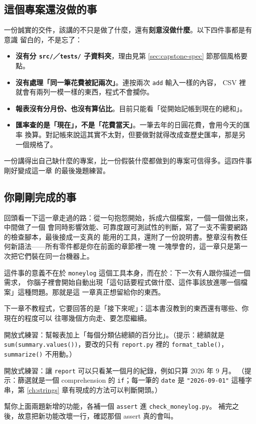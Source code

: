 \subsection*{這個專案還沒做的事}

一份誠實的交件，該講的不只是做了什麼，還有\textbf{刻意沒做什麼}。以下四件事都是有意識
留白的，不是忘了：

\begin{itemize}
\item \textbf{沒有分 \texttt{src/}／\texttt{tests/} 子資料夾}，理由見第
\ref{sec:capstone-spec} 節那個風格要點。
\item \textbf{沒有處理「同一筆花費被記兩次」}。連按兩次 \texttt{add} 輸入一樣的內容，
CSV 裡就會有兩列一模一樣的東西，程式不會攔你。
\item \textbf{報表沒有分月份、也沒有算佔比}。目前只能看「從開始記帳到現在的總和」。
\item \textbf{匯率查的是「現在」，不是「花費當天」}。一筆去年的日圓花費，會用今天的匯率
換算。對記帳來說這其實不太對，但要做對就得改成查歷史匯率，那是另一個規格了。
\end{itemize}

一份講得出自己缺什麼的專案，比一份假裝什麼都做到的專案可信得多。這四件事剛好變成這一章
的最後幾題練習。

\subsection*{你剛剛完成的事}

回頭看一下這一章走過的路：從一句抱怨開始，拆成六個檔案，一個一個做出來，中間做了一個
會同時影響效能、可靠度跟可測試性的判斷，寫了一支不需要網路的檢查腳本，最後接成一支真的
能用的工具，還附了一份說明書。整章沒有教任何新語法——所有零件都是你在前面的章節裡一塊
一塊學會的，這一章只是第一次把它們裝在同一台機器上。

這件事的意義不在於 \texttt{moneylog} 這個工具本身，而在於：下一次有人跟你描述一個需求，
你腦子裡會開始自動出現「這句話要程式做什麼、這件事該放進哪一個檔案」這種問題。那就是這
一章真正想留給你的東西。

下一章不教程式，它要回答的是「接下來呢」：這本書沒教到的東西還有哪些、你現在的程度可以
往哪幾個方向走、要怎麼繼續。

\begin{drills}[label=drills:capstone-handoff]
\item 開放式練習：幫報表加上「每個分類佔總額的百分比」。（提示：總額就是
\texttt{sum(summary.values())}，要改的只有 \texttt{report.py} 裡的
\texttt{format\_table()}，\texttt{summarize()} 不用動。）
\item 開放式練習：讓 \texttt{report} 可以只看某一個月的紀錄，例如只算 2026 年 9 月。
（提示：篩選就是一個 comprehension 的 \texttt{if}；每一筆的 \texttt{date} 是
\texttt{"2026-09-01"} 這種字串，第 \ref{ch:strings} 章有現成的方法可以判斷開頭。）
\item 幫你上面兩題新增的功能，各補一個 \texttt{assert} 進 \texttt{check\_moneylog.py}。
補完之後，故意把新功能改壞一行，確認那個 assert 真的會叫。
\end{drills}

